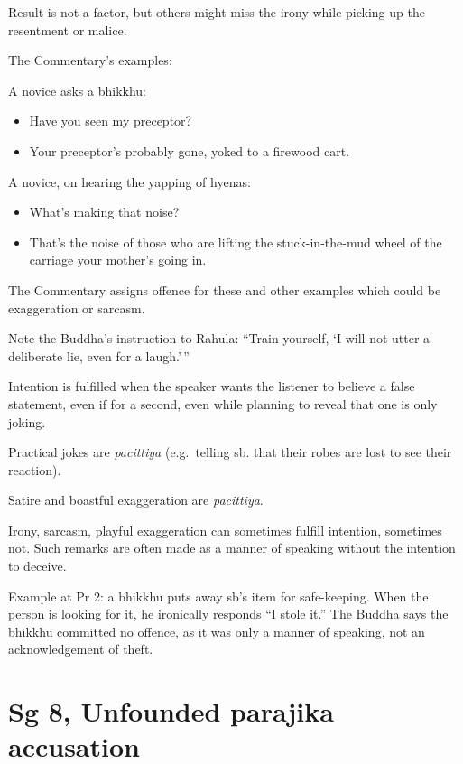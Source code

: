 Result is not a factor, but others might miss the irony while picking up
the resentment or malice.

The Commentary's examples:

A novice asks a bhikkhu:

\begin{itemize}
\tightlist
\item
  Have you seen my preceptor?
\item
  Your preceptor's probably gone, yoked to a firewood cart.
\end{itemize}

A novice, on hearing the yapping of hyenas:

\begin{itemize}
\tightlist
\item
  What's making that noise?
\item
  That's the noise of those who are lifting the stuck-in-the-mud wheel
  of the carriage your mother's going in.
\end{itemize}

The Commentary assigns offence for these and other examples which could
be exaggeration or sarcasm.

Note the Buddha's instruction to Rahula: ``Train yourself, `I will not
utter a deliberate lie, even for a laugh.'\,''

Intention is fulfilled when the speaker wants the listener to believe a
false statement, even if for a second, even while planning to reveal
that one is only joking.

Practical jokes are \emph{pacittiya} (e.g.~telling sb. that their robes
are lost to see their reaction).

Satire and boastful exaggeration are \emph{pacittiya}.

Irony, sarcasm, playful exaggeration can sometimes fulfill intention,
sometimes not. Such remarks are often made as a manner of speaking
without the intention to deceive.

Example at Pr 2: a bhikkhu puts away sb's item for safe-keeping. When
the person is looking for it, he ironically responds ``I stole it.'' The
Buddha says the bhikkhu committed no offence, as it was only a manner of
speaking, not an acknowledgement of theft.

\section{Sg 8, Unfounded parajika accusation}

